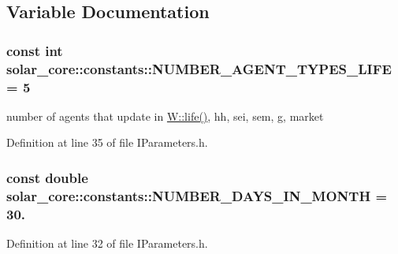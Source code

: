 \subsection{Variable Documentation}
\hypertarget{namespacesolar__core_1_1constants_a2ec52da705235aa418b0def4e509ef81}{}
\subsubsection[{N\+U\+M\+B\+E\+R\+\_\+\+A\+G\+E\+N\+T\+\_\+\+T\+Y\+P\+E\+S\+\_\+\+L\+I\+F\+E}]{\setlength{\rightskip}{0pt plus 5cm}const int solar\+\_\+core\+::constants\+::\+N\+U\+M\+B\+E\+R\+\_\+\+A\+G\+E\+N\+T\+\_\+\+T\+Y\+P\+E\+S\+\_\+\+L\+I\+F\+E = 5}\label{namespacesolar__core_1_1constants_a2ec52da705235aa418b0def4e509ef81}
number of agents that update in \hyperlink{classsolar__core_1_1_w_a5e64e5a7ef41c07fddf7994cd3f2693e}{W\+::life()}, hh, sei, sem, g, market 

Definition at line 35 of file I\+Parameters.\+h.

\hypertarget{namespacesolar__core_1_1constants_ad1ba09888c65cd255ec5e71f9121b1ed}{}
\subsubsection[{N\+U\+M\+B\+E\+R\+\_\+\+D\+A\+Y\+S\+\_\+\+I\+N\+\_\+\+M\+O\+N\+T\+H}]{\setlength{\rightskip}{0pt plus 5cm}const double solar\+\_\+core\+::constants\+::\+N\+U\+M\+B\+E\+R\+\_\+\+D\+A\+Y\+S\+\_\+\+I\+N\+\_\+\+M\+O\+N\+T\+H = 30.}\label{namespacesolar__core_1_1constants_ad1ba09888c65cd255ec5e71f9121b1ed}


Definition at line 32 of file I\+Parameters.\+h.

